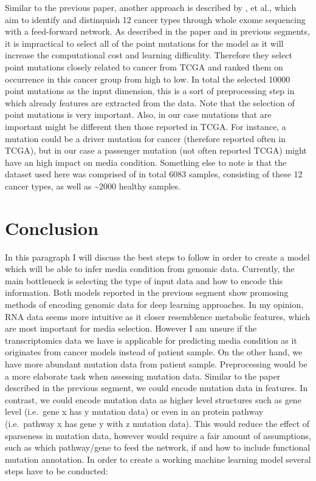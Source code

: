 \documentclass[11pt,]{article}
\begin{document}
Similar to the previous paper, another approach is described by
\citet{Sun2019}, et al., which aim to identify and distinquish 12 cancer
types through whole exome sequencing with a feed-forward network. As
described in the paper and in previous segments, it is impractical to
select all of the point mutations for the model as it will increase the
computational cost and learning difficulity. Therefore they select point
mutations closely related to cancer from TCGA and ranked them on
occurrence in this cancer group from high to low. In total the selected
10000 point mutations as the input dimension, this is a sort of
preprocessing step in which already features are extracted from the
data. Note that the selection of point mutations is very important.
Also, in our case mutations that are important might be different then
those reported in TCGA. For instance, a mutation could be a driver
mutation for cancer (therefore reported often in TCGA), but in our case
a passenger mutation (not often reported TCGA) might have an high impact
on media condition. Something else to note is that the dataset used here
was comprised of in total 6083 samples, consisting of these 12 cancer
types, as well as \textasciitilde{}2000 healthy samples.

\hypertarget{conclusion}{%
\section{Conclusion}\label{conclusion}}

In this paragraph I will discuss the best steps to follow in order to
create a model which will be able to infer media condition from genomic
data. Currently, the main bottleneck is selecting the type of input data
and how to encode this information. Both models reported in the previous
segment show promosing methods of encoding genomic data for deep
learning approaches. In my opinion, RNA data seems more intuitive as it
closer resemblence metabolic features, which are most important for
media selection. However I am unsure if the transcriptomics data we have
is applicable for predicting media condition as it originates from
cancer models instead of patient sample. On the other hand, we have more
abundant mutation data from patient sample. Preprocessing would be a
more elaborate task when assessing mutation data. Similar to the paper
described in the previous segment, we could encode mutation data in
features. In contrast, we could encode mutation data as higher level
structures such as gene level (i.e.~gene x has y mutation data) or even
in an protein pathway (i.e.~pathway x has gene y with z mutation data).
This would reduce the effect of sparseness in mutation data, however
would require a fair amount of assumptions, such as which pathway/gene
to feed the network, if and how to include functional mutation
annotation. In order to create a working machine learning model several
steps have to be conducted:
\end{document}
